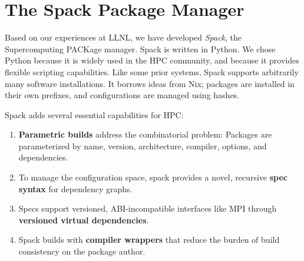 
\section{The Spack Package Manager}
\label{sec:implementation}
Based on our experiences at LLNL, we have developed
{\it Spack}, the Supercomputing PACKage manager.
Spack is written in Python.  We chose Python because it is
widely used in the HPC community, and because it provides
flexible scripting capabilities. 
%
Like some prior systems, Spack supports arbitrarily many software installations.
It borrows ideas from Nix; packages are installed in their own prefixes,
and configurations are managed using hashes.

\noindent
Spack adds several essential capabilities for HPC:
\begin{enumerate}
\item {\bf Parametric builds} address the combinatorial problem:
      Packages are parameterized by name, version, architecture, compiler, 
      options, and dependencies.
\item To manage the configuration space, spack provides a novel, 
      recursive {\bf spec syntax} for dependency graphs.
\item Specs support versioned, ABI-incompatible interfaces like MPI through
      {\bf versioned virtual dependencies}.
\item Spack builds with {\bf compiler wrappers} that reduce the burden of build
      consistency on the package author.
\end{enumerate}











